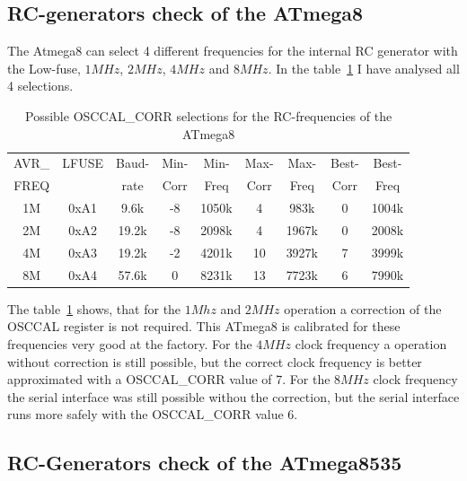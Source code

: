 \subsection{RC-generators check of the ATmega8}

The Atmega8 can select 4 different frequencies for the internal RC generator
with the Low-fuse, \(1MHz\), \(2MHz\), \(4MHz\) and \(8MHz\).
In the table~\ref{tab:mega8freq} I have analysed all 4 selections.

\begin{table}[H]
  \begin{center}
    \begin{tabular}{| c | c | c || c | c || c | c || c | c |}
    \hline
             AVR\_ & LFUSE & Baud- & Min- & Min- & Max- & Max- & Best- & Best-  \\
             FREQ  &       & rate & Corr & Freq & Corr & Freq  & Corr  & Freq  \\
    \hline
    \hline
                1M & 0xA1  &  9.6k &  -8  & 1050k &  4  & 983k  & 0  & 1004k \\
    \hline
                2M & 0xA2  & 19.2k &  -8  & 2098k &  4  & 1967k & 0  & 2008k \\
    \hline
                4M & 0xA3  & 19.2k &  -2  & 4201k & 10  & 3927k & 7  & 3999k \\
    \hline
                8M & 0xA4  & 57.6k &   0  & 8231k & 13  & 7723k & 6  & 7990k \\
    \hline
    \end{tabular}
  \end{center}
  \caption{Possible OSCCAL\_CORR selections for the RC-frequencies of the ATmega8}
  \label{tab:mega8freq}
\end{table}

The table~\ref{tab:mega8freq} shows, that for the \(1Mhz\) and \(2MHz\) operation a correction of the
OSCCAL register is not required. This ATmega8 is calibrated for these frequencies
very good at the factory.
For the \(4MHz\) clock frequency a operation without correction is still possible,
but the correct clock frequency is better approximated with a OSCCAL\_CORR value of 7.
For the \(8MHz\) clock frequency the serial interface was still possible
withou the correction, but the serial interface runs more safely with
the OSCCAL\_CORR value 6.

\subsection{RC-Generators check of the ATmega8535}

